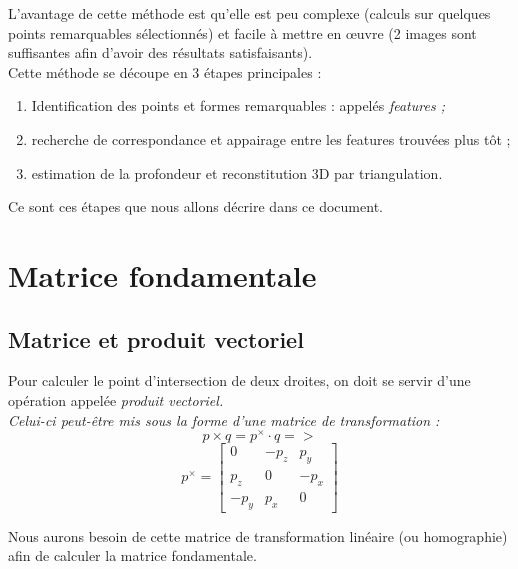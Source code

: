 \documentclass[a4paper]{article}
\begin{document}
L'avantage de cette méthode est qu'elle est peu complexe (calculs sur quelques points remarquables sélectionnés) et facile à mettre en œuvre (2 images sont suffisantes afin d'avoir des résultats satisfaisants).\\

Cette méthode se découpe en 3 étapes principales :
\begin{enumerate}
  \item Identification des points et formes remarquables : appelés \em{features} ;
  \item recherche de correspondance et appairage entre les features trouvées plus tôt ;
  \item estimation de la profondeur et reconstitution 3D par triangulation.
\end{enumerate}

Ce sont ces étapes que nous allons décrire dans ce document.

\clearpage

\section{Matrice fondamentale}

\subsection{Matrice et produit vectoriel}

Pour calculer le point d'intersection de deux droites, on doit se servir d'une opération appelée \em{produit vectoriel}.\\
Celui-ci peut-être mis sous la forme d'une matrice de transformation :
\begin{equation}
  p \times q = p^\times \cdot q =>
\end{equation}
\begin{equation}
  p^\times =
  \begin{bmatrix}
    0 & -p_z & p_y\\
    p_z & 0 & -p_x\\
    -p_y & p_x & 0
  \end{bmatrix}
\end{equation}

Nous aurons besoin de cette matrice de transformation linéaire (ou homographie) afin de calculer la matrice fondamentale.
\end{document}

